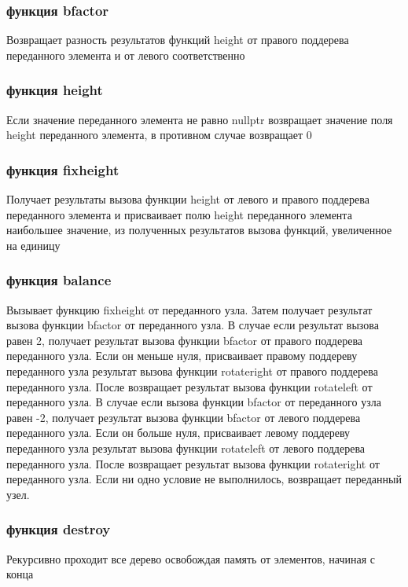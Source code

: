 \documentclass[a4paper,12pt]{article}
\begin{document}
\begin{enumerate}
      \subsubsection{функция bfactor}
      Возвращает разность результатов функций height от правого поддерева переданного элемента и от левого соответственно
      
      \subsubsection{функция height}
      Если значение переданного элемента не равно nullptr возвращает значение поля height переданного элемента, в противном случае возвращает 0
      
       \subsubsection{функция fixheight}
       Получает результаты вызова функции height от левого и правого поддерева переданного элемента и присваивает полю height переданного элемента наибольшее значение, из полученных результатов вызова функций, увеличенное на единицу
       
       \subsubsection{функция balance}
       Вызывает функцию fixheight от переданного узла. Затем получает результат вызова функции bfactor от переданного узла. В случае если результат вызова равен 2, получает результат вызова функции bfactor от правого поддерева переданного узла. Если он меньше нуля, присваивает правому поддереву переданного узла результат вызова функции rotateright от правого поддерева переданного узла. После возвращает результат вызова функции rotateleft от переданного узла. 
       В случае если вызова функции bfactor от переданного узла равен -2, получает результат вызова функции bfactor от левого поддерева переданного узла. Если он больше нуля, присваивает левому поддереву переданного узла результат вызова функции rotateleft от левого поддерева переданного узла. После возвращает результат вызова функции rotateright от переданного узла. 
       Если ни одно условие не выполнилось, возвращает переданный узел.
      
      \subsubsection{функция destroy}
      Рекурсивно проходит все дерево освобождая память от элементов, начиная с конца
      

\end{enumerate}
\end{document}
